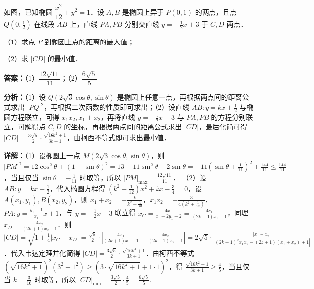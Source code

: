 \begin{question}[points=15]
如图，已知椭圆 $\dfrac{x^2}{12} + y^2 = 1$．设 $A,B$ 是椭圆上异于 $P(0,1)$ 的两点，且点 $Q\left(0,\frac{1}{2}\right)$ 在线段 $AB$ 上，直线 $PA, PB$ 分别交直线 $y = -\frac{1}{2}x + 3$ 于 $C, D$ 两点．

（1）求点 $P$ 到椭圆上点的距离的最大值；

（2）求 $|CD|$ 的最小值．
\begin{solution}
\textbf{答案：}（1）$\dfrac{12\sqrt{11}}{11}$；（2）$\dfrac{6\sqrt{5}}{5}$

\textbf{分析：}（1）设 $Q(2\sqrt{3}\cos\theta, \sin\theta)$ 是椭圆上任意一点，再根据两点间的距离公式求出 $|PQ|^2$，再根据二次函数的性质即可求出；（2）设直线 $AB: y=kx+\frac{1}{2}$ 与椭圆方程联立，可得 $x_1x_2, x_1+x_2$，再将直线 $y=-\frac{1}{2}x+3$ 与 $PA, PB$ 的方程分别联立，可解得点 $C,D$ 的坐标，再根据两点间的距离公式求出 $|CD|$，最后化简可得 $|CD| = \frac{3\sqrt{5}}{2}\cdot\frac{\sqrt{16k^2+1}}{3k+1}$，由柯西不等式即可求出最小值．

\textbf{详解：}（1）设椭圆上一点 $M(2\sqrt{3}\cos\theta,\sin\theta)$，则 $|PM|^2 = 12\cos^2\theta + (1-\sin\theta)^2 = 13 - 11\sin^2\theta - 2\sin\theta = -11\left(\sin\theta+\frac{1}{11}\right)^2 + \frac{144}{11} \le \frac{144}{11}$，当且仅当 $\sin\theta = -\frac{1}{11}$ 时取等，所以 $|PM|_{\max} = \frac{12\sqrt{11}}{11}$．
（2）设 $AB: y = kx + \frac{1}{2}$，代入椭圆方程得 $(k^2+\frac{1}{12})x^2 + kx - \frac{3}{4}=0$，设 $A(x_1,y_1), B(x_2,y_2)$，则 $x_1+x_2 = -\frac{k}{k^2+\frac{1}{12}}$，$x_1x_2 = -\frac{3}{4(k^2+\frac{1}{12})}$．$PA: y = \frac{y_1-1}{x_1}x+1$，与 $y=-\frac{1}{2}x+3$ 联立得 $x_C = \frac{4x_1}{x_1+2y_1-2} = \frac{4x_1}{(2k+1)x_1-1}$，同理 $x_D = \frac{4x_2}{(2k+1)x_2-1}$．则 $|CD| = \sqrt{1+\frac{1}{4}}|x_C-x_D| = \frac{\sqrt{5}}{2}\cdot\left|\frac{4x_1}{(2k+1)x_1-1} - \frac{4x_2}{(2k+1)x_2-1}\right| = 2\sqrt{5}\cdot\frac{|x_1-x_2|}{|(2k+1)^2 x_1x_2 - (2k+1)(x_1+x_2)+1|}$．代入韦达定理并化简得 $|CD| = \frac{3\sqrt{5}}{2}\cdot\frac{\sqrt{16k^2+1}}{3k+1}$．由柯西不等式 $(\sqrt{16k^2+1})^2(3^2+1^2) \ge (3\cdot\sqrt{16k^2+1}+1\cdot1)^2$，得 $\frac{\sqrt{16k^2+1}}{3k+1} \ge \frac{4}{5}$，当且仅当 $k=\frac{3}{16}$ 时取等，所以 $|CD|_{\min} = \frac{3\sqrt{5}}{2}\cdot\frac{4}{5} = \frac{6\sqrt{5}}{5}$.
\end{solution}
\end{question}

